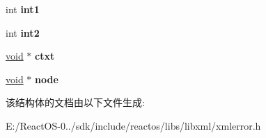 \begin{DoxyCompactItemize}
int {\bfseries int1}
\item 
\mbox{\label{struct__xml_error_af540575ab3235c19f72574b54ba727dd}} 
int {\bfseries int2}
\item 
\mbox{\label{struct__xml_error_a7258bcb21de5672a51c7ef270cc0be94}} 
\hyperlink{interfacevoid}{void} $\ast$ {\bfseries ctxt}
\item 
\mbox{\label{struct__xml_error_aa5cec792d70f116cc88d9e57f18829df}} 
\hyperlink{interfacevoid}{void} $\ast$ {\bfseries node}
\end{DoxyCompactItemize}


该结构体的文档由以下文件生成\+:\begin{DoxyCompactItemize}
\item 
E\+:/\+React\+O\+S-\/0../sdk/include/reactos/libs/libxml/xmlerror.\+h\end{DoxyCompactItemize}
